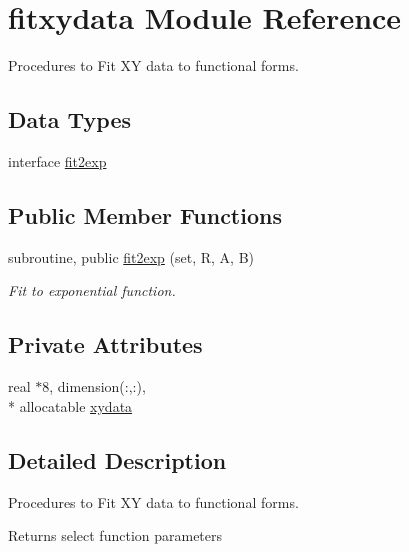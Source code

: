 \hypertarget{classfitxydata}{\section{fitxydata Module Reference}
\label{classfitxydata}
}


Procedures to Fit X\+Y data to functional forms.  


\subsection*{Data Types}
\begin{DoxyCompactItemize}
\item 
interface \hyperlink{interfacefitxydata_1_1fit2exp}{fit2exp}
\end{DoxyCompactItemize}
\subsection*{Public Member Functions}
\begin{DoxyCompactItemize}
\item 
subroutine, public \hyperlink{classfitxydata_a9f00dca017c2372da0c3c95cdf0ddb31}{fit2exp} (set, R, A, B)
\begin{DoxyCompactList}\small\item\em Fit to exponential function. \end{DoxyCompactList}\end{DoxyCompactItemize}
\subsection*{Private Attributes}
\begin{DoxyCompactItemize}
\item 
real $\ast$8, dimension(\+:,\+:), \\*
allocatable \hyperlink{classfitxydata_ad69a6716eab16a1f8c170a0d0a7ed499}{xydata}
\end{DoxyCompactItemize}


\subsection{Detailed Description}
Procedures to Fit X\+Y data to functional forms. 

Returns select function parameters 

